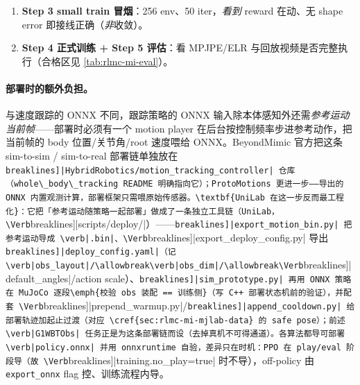 \begin{practice}
\begin{enumerate}
\begin{codebox}[bash]{训练前静态自检:先 grep 定位 cfg 类，再打印 std/threshold/body\_names（不启动训练）}
    p = getattr(term, "params", {}) or {}
    print(f"{name:30s} weight={getattr(term,'weight',None)} std={p.get('std')} "
          f"bodies={p.get('body_names', p.get('body_name'))}")
PY
# 期望看到 motion_body_pos std=0.3 / motion_body_ori std=0.4 / motion_body_ang_vel std=3.14 …
\end{codebox}
（若你本地 cfg 的字段组织与此略有出入，关键不在脚本逐字照跑，而在掌握「配置是可静态 import 的 dataclass，训练前先把 std/阈值/body\_names 打出来核一遍」这一招。）
\item \textbf{Step 3 small train 冒烟}：256 env、50 iter，\emph{看到} reward 在动、无 shape error 即接线正确（\emph{非}收敛）。
\item \textbf{Step 4 正式训练 + Step 5 评估}：看 MPJPE/ELR 与回放视频是否完整执行（合格区见 \cref{tab:rlmc-mi-eval}）。
\end{enumerate}
\end{practice}

\paragraph{部署时的额外负担。}与速度跟踪的 ONNX 不同，跟踪策略的 ONNX 输入除本体感知外还需\emph{参考运动当前帧}——部署时必须有一个 motion player 在后台按控制频率步进参考动作，把当前帧的 body 位置/关节角/root 速度喂给 ONNX。BeyondMimic 官方把这条 sim-to-sim / sim-to-real 部署链单独放在 \Verb[breaklines]|HybridRobotics/motion_tracking_controller| 仓库（whole\_body\_tracking README 明确指向它）；ProtoMotions 更进一步——导出的 ONNX 内置观测计算，部署框架只需喂原始传感器。\textbf{UniLab 在这一步反而最工程化}：它把「参考运动随策略一起部署」做成了一条独立工具链（UniLab，\Verb[breaklines]|scripts/deploy/|）——\Verb[breaklines]|export_motion_bin.py| 把参考运动导成 \verb|.bin|、\Verb[breaklines]|export_deploy_config.py| 导出 \Verb[breaklines]|deploy_config.yaml|（记 \verb|obs_layout|/\allowbreak\verb|obs_dim|/\allowbreak\Verb[breaklines]|default_angles|/action scale）、\Verb[breaklines]|sim_prototype.py| 再用 ONNX 策略在 MuJoCo 逐段\emph{校验 obs 装配 == 训练侧}（写 C++ 部署状态机前的验证），并配套 \Verb[breaklines]|prepend_warmup.py|/\allowbreak\Verb[breaklines]|append_cooldown.py| 给部署轨迹加起止过渡（对应 \cref{sec:rlmc-mi-mjlab-data} 的 safe pose）；前述 \verb|G1WBTObs| 任务正是为这条部署链而设（去掉真机不可得通道）。各算法都导可部署 \verb|policy.onnx| 并用 onnxruntime 自验，差异只在时机：PPO 在 play/eval 阶段导（故 \Verb[breaklines]|training.no_play=true| 时不导），off-policy 由 \verb|export_onnx| flag 控、训练流程内导。

